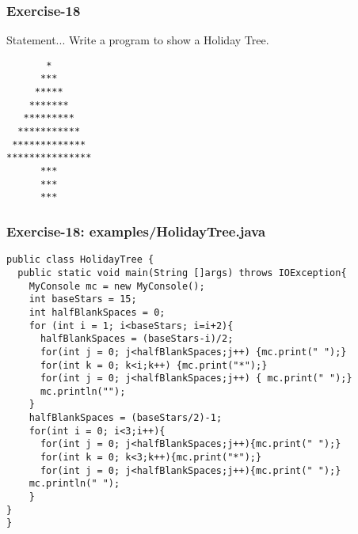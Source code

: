 \documentclass[xcolor=dvipsnames,dvip,notes=show,table]{beamer}
\begin{document}
\begin{frame}[fragile]
\frametitle{Exercise-18}
\begin{block}{Statement...}
 Write a program to show a Holiday Tree.
\end{block}

\begin{lstlisting}
       *
      ***
     *****
    *******
   *********
  ***********
 *************
***************
      ***
      ***
      ***
\end{lstlisting}



\end{frame}


\begin{frame}[fragile]
\frametitle{Exercise-18: examples/HolidayTree.java}
\tiny
\begin{lstlisting}
public class HolidayTree {
  public static void main(String []args) throws IOException{
    MyConsole mc = new MyConsole();
    int baseStars = 15;
    int halfBlankSpaces = 0;
    for (int i = 1; i<baseStars; i=i+2){
      halfBlankSpaces = (baseStars-i)/2;
      for(int j = 0; j<halfBlankSpaces;j++) {mc.print(" ");}
      for(int k = 0; k<i;k++) {mc.print("*");}
      for(int j = 0; j<halfBlankSpaces;j++) { mc.print(" ");}
      mc.println("");
    }
    halfBlankSpaces = (baseStars/2)-1;
    for(int i = 0; i<3;i++){
      for(int j = 0; j<halfBlankSpaces;j++){mc.print(" ");}
      for(int k = 0; k<3;k++){mc.print("*");}
      for(int j = 0; j<halfBlankSpaces;j++){mc.print(" ");}
    mc.println(" ");
    }
}
}
\end{lstlisting}
\end{frame}



\frame{
\titlepage

}


\end{document}
